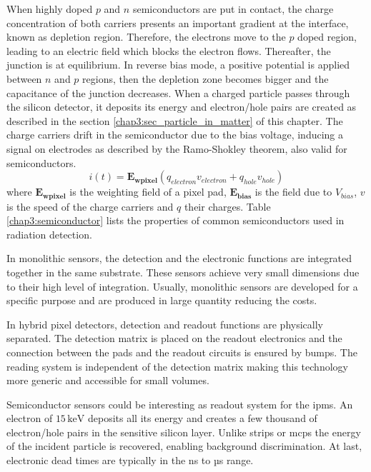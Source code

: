 \begin{refsection}
  
  When highly doped $p$ and $n$ semiconductors are put in contact, the charge concentration of both carriers presents an important gradient at the interface, known as depletion region. Therefore, the electrons move to the $p$ doped region, leading to an electric field which blocks the electron flows. Thereafter, the junction is at equilibrium. In reverse bias mode, a positive potential is applied between $n$ and $p$ regions, then the depletion zone becomes bigger and the capacitance of the junction decreases. When a charged particle passes through the silicon detector, it deposits its energy and electron/hole pairs are created as described in the section \ref{chap3:sec_particle_in_matter} of this chapter. The charge carriers drift in the semiconductor due to the bias voltage, inducing a signal on electrodes as described by the Ramo-Shokley theorem, also valid for semiconductors\cite{Cavalleri1971}.
  \begin{equation}
    i(t) =\boldsymbol{E_{wpixel}} \left( q_{electron} v_{electron}+ q_{hole} v_{hole} \right)
  \end{equation}
  where $\boldsymbol{E_{wpixel}}$ is the weighting field of a pixel pad, $\boldsymbol{E_{bias}}$ is the field due to $V_{bias}$, $v$ is the speed of the charge carriers and $q$ their charges. Table \ref{chap3:semiconductor} lists the properties of common semiconductors used in radiation detection.

  In monolithic sensors, the detection and the electronic functions are integrated together in the same substrate. These sensors achieve very small dimensions due to their high level of integration. Usually, monolithic sensors are developed for a specific purpose and are produced in large quantity reducing the costs.

  In hybrid pixel detectors, detection and readout functions are physically separated. The detection matrix is placed on the readout electronics and the connection between the pads and the readout circuits is ensured by bumps. The reading system is independent of the detection matrix making this technology more generic and accessible for small volumes.
  

  Semiconductor sensors could be interesting as readout system for the \acrshort{ipm}s. An electron of $15\,\mathrm{keV}$ deposits all its energy and creates a few thousand of electron/hole pairs in the sensitive silicon layer. Unlike strips or \acrshort{mcp}s the energy of the incident particle is recovered, enabling background discrimination. At last, electronic dead times are typically in the ns to µs range.


\end{refsection}
